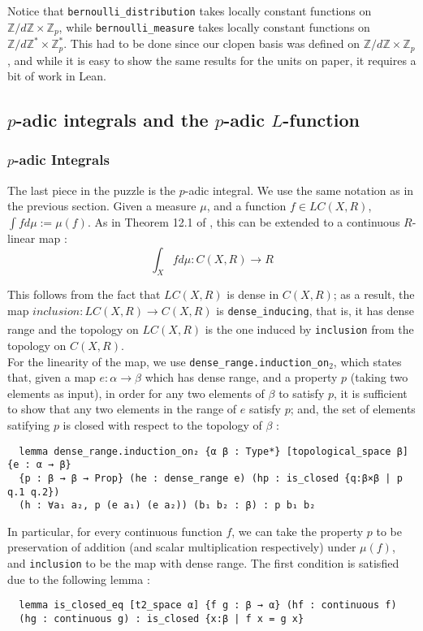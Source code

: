 \documentclass[11pt]{article}
\newcommand{\lean}[1]{\texttt{#1}\xspace} %
\begin{document}
Notice that \lean{bernoulli\_distribution} takes locally constant functions on $\mathbb{Z}/d \mathbb{Z} \times \mathbb{Z}_p$, 
while \newline \lean{bernoulli\_measure} takes locally constant functions on $\mathbb{Z}/d \mathbb{Z}^* \times \mathbb{Z}_p^*$. This had to be done since our clopen basis was defined on 
$\mathbb{Z}/d \mathbb{Z} \times \mathbb{Z}_p$, and while it is easy to show the same results for the units on paper, it requires a bit of work in Lean.

\subsection{$p$-adic integrals and the $p$-adic $L$-function}
\subsubsection{$p$-adic Integrals}
The last piece in the puzzle is the $p$-adic integral. We use the same notation as in the previous
section. Given a measure $\mu$, and a function $f \in LC(X, R)$,
$\int f d\mu := \mu(f)$. As in Theorem 12.1 of \cite{cyc}, this can be extended to a
continuous $R$-linear map :
$$ \int_X f d\mu : C(X, R) \xrightarrow[]{} R $$

This follows from the fact that $LC(X, R)$ is dense in $C(X, R)$; as a result, the map 
\newline $inclusion : LC(X, R) \xrightarrow[]{} C(X, R)$
is \lean{dense\_inducing}, that is, it has dense range and the topology on $LC(X, R)$ is the one
induced by \lean{inclusion} from the topology on $C(X,R)$. \\

For the linearity of the map, we use \lean{dense\_range.induction\_on$_2$}, which states that, given a map $e : \alpha \to \beta$ which has dense range, 
and a property $p$ (taking two elements as input), in order for any two elements of $\beta$ to satisfy $p$, it is sufficient to show that any two elements 
in the range of $e$ satisfy $p$; and, the set of elements satifying $p$ is closed with respect to the topology of $\beta$ :
\begin{lstlisting}
  lemma dense_range.induction_on₂ {α β : Type*} [topological_space β] {e : α → β} 
  {p : β → β → Prop} (he : dense_range e) (hp : is_closed {q:β×β | p q.1 q.2}) 
  (h : ∀a₁ a₂, p (e a₁) (e a₂)) (b₁ b₂ : β) : p b₁ b₂
\end{lstlisting}

In particular, for every continuous function $f$, we can take the property $p$ to be preservation of addition (and scalar multiplication respectively) under 
$\mu (f)$, and \lean{inclusion} to be the map with dense range. The first condition is satisfied due to the following lemma :
\begin{lstlisting}
  lemma is_closed_eq [t2_space α] {f g : β → α} (hf : continuous f) 
  (hg : continuous g) : is_closed {x:β | f x = g x}
\end{lstlisting}
\end{document}
